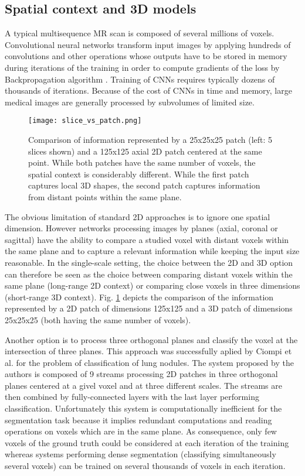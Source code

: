 \documentclass[preprint,12pt]{elsarticle}
\begin{document}
\subsection{Spatial context and 3D models}
\label{model_3D}
A typical multisequence MR scan is composed of several millions of voxels. Convolutional neural networks transform input images by applying hundreds of convolutions and other operations whose outputs have to be stored in memory during iterations of the training in order to compute gradients of the loss by Backpropagation algorithm \cite{dreyfus1990artificial}. Training of CNNs requires typically dozens of thousands of iterations. Because of the cost of CNNs in time and memory, large medical images are generally processed by subvolumes of limited size. 

\begin{figure}[h!]
\centering
\texttt{[image: slice\_vs\_patch.png]}
\caption{Comparison of information represented by a 25x25x25 patch (left: 5 slices shown) and a 125x125 axial 2D patch centered at the same point. While both patches have the same number of voxels, the spatial context is considerably different. While the first patch captures local 3D shapes, the second patch captures information from distant points within the same plane.}
\label{fig_patch_slice}
\end{figure}

The obvious limitation of standard 2D approaches is to ignore one spatial dimension. However networks processing images by planes (axial, coronal or sagittal) have the ability to compare a studied voxel with distant voxels within the same plane and to capture a relevant information while keeping the input size reasonable. In the single-scale setting, the choice between the 2D and 3D option can therefore be seen as the choice between comparing distant voxels within the same plane (long-range 2D context) or comparing close voxels in three dimensions (short-range 3D context). Fig. \ref{fig_patch_slice} depicts the comparison of the information represented by a 2D patch of dimensions 125x125 and a 3D patch of dimensions 25x25x25 (both having the same number of voxels). 



Another option is to process three orthogonal planes and classify the voxel at the intersection of three planes. This approach was successfully aplied by Ciompi et al. \cite{ciompi2017towards} for the problem of classification of lung nodules. The system proposed by the authors is composed of 9 streams processing 2D patches in three orthogonal planes centered at a givel voxel and at three different scales. The streams are then combined by fully-connected layers with the last layer performing classification. Unfortunately this system is computationally inefficient for the segmentation task because it implies redundant computations and reading operations on voxels which are in the same plane. As consequence, only few voxels of the ground truth could be considered at each iteration of the training whereas systems performing dense segmentation (classifying simultaneously several voxels) can be trained on several thousands of voxels in each iteration.
\end{document}

